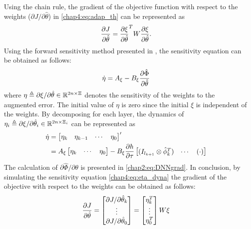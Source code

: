 Using the chain rule, the gradient of the objective function with respect to the weights (\ie $\partial J/\partial \hat\theta$) in \eqref{chap4:eq:adap_th} can be represented as
\begin{equation}
    {\partial J\over\partial \hat\theta}
    =
    {\partial \xi\over\partial \hat\theta}^TW
    {\partial \xi\over\partial \hat\theta}
    .
\end{equation}
Using the forward sensitivity method presented in \cite{RN49}, the sensitivity equation can be obtained as follows:
\begin{equation}
    \dot \eta =A_\xi - B_\xi {\partial \hat\Phi\over\partial \hat\theta}
    \label{chap4:eq:eta_dyna}
\end{equation}
where $\eta\triangleq \partial \xi/\partial \hat\theta\in\mathbb{R}^{2n\times \Xi}$ denotes the sensitivity of the weights to the augmented error.
The initial value of $\eta$ is zero since the initial $\xi$ is independent of the weights.
By decomposing for each layer, the dynamics of $\eta_i\triangleq \partial \xi/\partial \hat\theta_i\in\mathbb{R}^{2n\times \Xi_i}$ can be represented as
\begin{equation}
    \begin{aligned}
        \dot \eta&= 
        \begin{bmatrix}
            \eta_k&
            \eta_{k-1}&
            \cdots &
            \eta_0
        \end{bmatrix}'
        \\
        &=A_\xi
        \begin{bmatrix}
            \eta_k&
            \cdots &
            \eta_0
        \end{bmatrix}
        -B_\xi{\partial h\over\partial \tau}
        \begin{bmatrix}
            (I_{l_{k+1}}\otimes \hat\phi_{k}^T  )&
        \cdots&
        (\cdot)
        \end{bmatrix}
    \end{aligned}
\end{equation}
The calculation of $\partial \hat\Phi/\partial\hat\theta$ is presented in \eqref{chap2:eq:DNNgrad}.
In conclusion, by simulating the sensitivity equation \eqref{chap4:eq:eta_dyna} the gradient of the objective with respect to the weights can be obtained as follows:
\begin{equation}
    {\partial J\over\partial\hat\theta}
    =
    \begin{bmatrix}
        \partial J/\partial\hat\theta_k\\\vdots\\\partial J/\partial\hat\theta_0\\
    \end{bmatrix}    =
    \begin{bmatrix}
        \eta_k^T\\\vdots\\\eta_0^T\\
    \end{bmatrix}
    W
    \xi
\end{equation}

